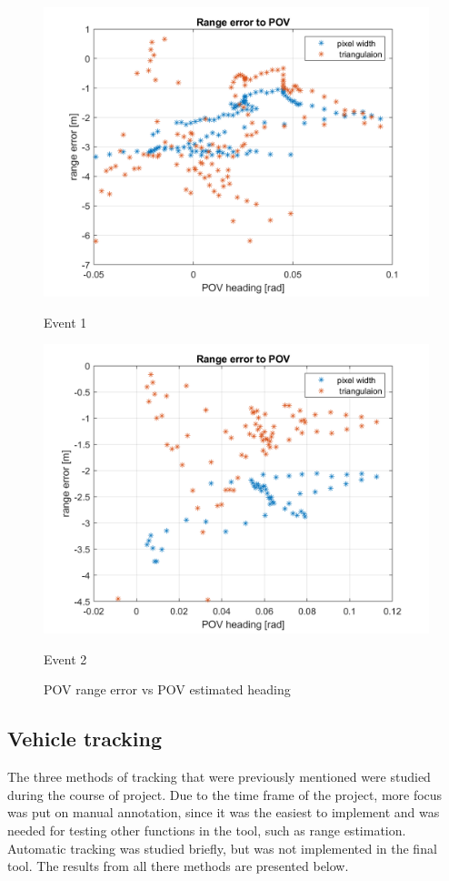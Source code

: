 \begin{figure}[H]
\begin{minipage}[b]{0.49\textwidth}
    \includegraphics[width=\textwidth]{FiguresMat/range_heading_error_long_10794257.png}
    \caption*{Event 1}
\end{minipage}
\begin{minipage}[b]{0.50\textwidth}
    \includegraphics[width=\textwidth]{FiguresMat/range_heading_error_long_116147345.png}
    \caption*{Event 2}
\end{minipage}
\caption{POV range error vs POV estimated heading}
\label{fig:range_error_vs_heading}
\end{figure}

\subsection{Vehicle tracking}
The three methods of tracking that were previously mentioned were studied during the course of project. Due to the time frame of the project, more focus was put on manual annotation, since it was the easiest to implement and was needed for testing other functions in the tool, such as range estimation. Automatic tracking was studied briefly, but was not implemented in the final tool. The results from all there methods are presented below. 

